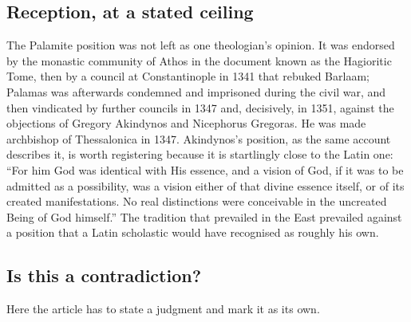 \subsection{Reception, at a stated ceiling}

The Palamite position was not left as one theologian's opinion. It was endorsed by the monastic community of Athos in the document known as the Hagioritic Tome, then by a council at Constantinople in 1341 that rebuked Barlaam; Palamas was afterwards condemned and imprisoned during the civil war, and then vindicated by further councils in 1347 and, decisively, in 1351, against the objections of Gregory Akindynos and Nicephorus Gregoras. He was made archbishop of Thessalonica in 1347. Akindynos's position, as the same account describes it, is worth registering because it is startlingly close to the Latin one: ``For him God was identical with His essence, and a vision of God, if it was to be admitted as a possibility, was a vision either of that divine essence itself, or of its created manifestations. No real distinctions were conceivable in the uncreated Being of God himself.'' The tradition that prevailed in the East prevailed against a position that a Latin scholastic would have recognised as roughly his own.

\subsection{Is this a contradiction?}

Here the article has to state a judgment and mark it as its own.


